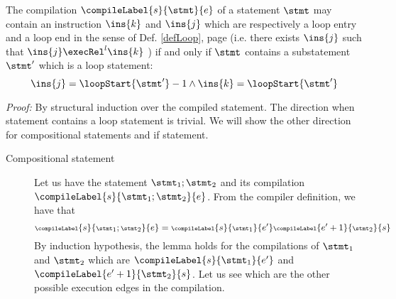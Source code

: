 \begin{compProp9A}  The compilation $\compileLabel{s}{\stmt}{e}$ of a statement $\stmt$ may contain an instruction $\ins{k}$ and $\ins{j}$  which are respectively 
a loop entry and a loop end  in the sense of Def.
\ref{defLoop}, page \pageref{defLoop}  (i.e. there exists $\ins{j}$ such that $\ins{j} \execRel^{l} \ins{k}$ ) if and only if  $\stmt$  contains 
 a substatement $\stmt'$ which is a loop statement:
 $$ \ins{j} = \loopStart{\stmt'}  - 1 \wedge  \ins{k} = \loopStart{\stmt'}  $$
\end{compProp9A}
\textit{Proof:}
By structural induction over the compiled statement. The direction when statement contains a loop statement is trivial.
We will show the other direction for compositional statements and if statement.
\begin{description}
\item[Compositional statement]
Let us have the statement $\stmt_1;\stmt_2$ and its compilation 
 $\compileLabel{s}{\stmt_1;\stmt_2}{e}$. From the compiler definition,
we have that  
$$ \scriptsize{\compileLabel{s}{\stmt_1;\stmt_2}{e} = \compileLabel{s}{\stmt_1}{e'}\compileLabel{e'+1}{\stmt_2}{s}}$$
 By induction hypothesis, the lemma holds for  the compilations of $\stmt_1$ and   $\stmt_2$ which are 
$\compileLabel{s}{\stmt_1}{e'}$ and  $\compileLabel{e'+1}{\stmt_2}{s}$.
Let us see which are the other possible execution edges in the compilation.



\end{description}
